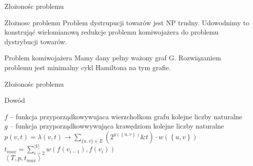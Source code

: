 \begin{frame}{Złożonośc problemu}
	
	\begin{block}{Złożnosc problemu}
		Problem dystrupucji towarów jest NP trudny.
		Udowodnimy to konstrująć wielomianową redukcje problemu komiwojażera do problemu dystrybucji towarów.
	\end{block}

	\begin{block}{Problem komiwojażera}
		Mamy dany pełny ważony graf G. Rozwiązaniem problemu jest minimalny cykl Hamiltona na tym grafie.
	\end{block}

\end{frame}

\begin{frame}{Złożonośc problemu}
	
	\begin{block}{Dowód}
		
		\begin{algorithm}[H]
			$f$ -- funkcja przyporządkowywujaca wierzchołkom grafu kolejne liczby naturalne \\
			$g$ -- funkcja przyporządkowwywująca krawędziom kolejne liczby naturalne \\
			$p(v, t) = \lambda\left( v, t \right) \rightarrow \sum_{\{u, v\} \in E} (2^{g(\left\{u, v\right\})} \& t) \cdot w(\left\{ u, v \right\}) $ \\
			$t_{max} = \sum\limits_{i=2}^{|V|} w(f(v_{i-1}), f(v_i))$ \\
			\Return $\left< T, p , t_{max} \right> $
		\end{algorithm}
	
	\end{block}

\end{frame}
